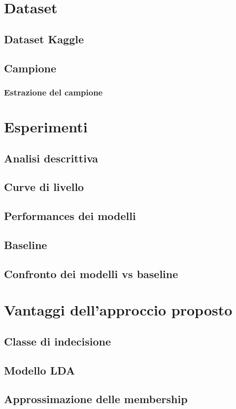 \documentclass[12pt]{report}
\theoremstyle{definition}
\begin{document}
\section{Dataset}
\subsection{Dataset Kaggle}
\subsection{Campione}
\subsubsection{Estrazione del campione}
\section{Esperimenti}
\subsection{Analisi descrittiva}
\subsection{Curve di livello}
\subsection{Performances dei modelli}
\subsection{Baseline}
\subsection{Confronto dei modelli vs baseline}
\section{Vantaggi dell'approccio proposto}
\subsection{Classe di indecisione}
\subsection{Modello LDA}
\subsection{Approssimazione delle membership}
\end{document}

